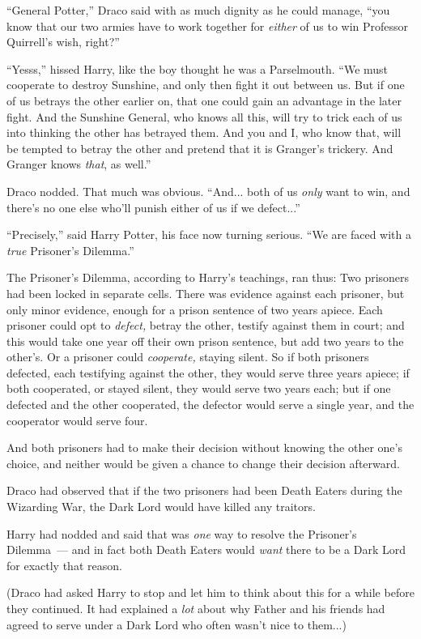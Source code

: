 ``General Potter,'' Draco said with as much dignity as he could manage, ``you know that our two armies have to work together for \emph{either} of us to win Professor Quirrell's wish, right?''

``Yesss,'' hissed Harry, like the boy thought he was a Parselmouth. ``We must cooperate to destroy Sunshine, and only then fight it out between us. But if one of us betrays the other earlier on, that one could gain an advantage in the later fight. And the Sunshine General, who knows all this, will try to trick each of us into thinking the other has betrayed them. And you and I, who know that, will be tempted to betray the other and pretend that it is Granger's trickery. And Granger knows \emph{that}, as well.''

Draco nodded. That much was obvious. ``And... both of us \emph{only} want to win, and there's no one else who'll punish either of us if we defect...''

``Precisely,'' said Harry Potter, his face now turning serious. ``We are faced with a \emph{true} Prisoner's Dilemma.''

The Prisoner's Dilemma, according to Harry's teachings, ran thus: Two prisoners had been locked in separate cells. There was evidence against each prisoner, but only minor evidence, enough for a prison sentence of two years apiece. Each prisoner could opt to \emph{defect,} betray the other, testify against them in court; and this would take one year off their own prison sentence, but add two years to the other's. Or a prisoner could \emph{cooperate,} staying silent. So if both prisoners defected, each testifying against the other, they would serve three years apiece; if both cooperated, or stayed silent, they would serve two years each; but if one defected and the other cooperated, the defector would serve a single year, and the cooperator would serve four.

And both prisoners had to make their decision without knowing the other one's choice, and neither would be given a chance to change their decision afterward.

Draco had observed that if the two prisoners had been Death Eaters during the Wizarding War, the Dark Lord would have killed any traitors.

Harry had nodded and said that was \emph{one} way to resolve the Prisoner's Dilemma~--- and in fact both Death Eaters would \emph{want} there to be a Dark Lord for exactly that reason.

(Draco had asked Harry to stop and let him to think about this for a while before they continued. It had explained a \emph{lot} about why Father and his friends had agreed to serve under a Dark Lord who often wasn't nice to them...)

